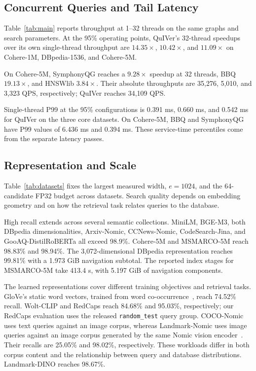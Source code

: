 \subsection{Concurrent Queries and Tail Latency}
\label{sec:threads}
Table~\ref{tab:main} reports throughput at 1--32 threads on the same graphs and search parameters. At the 95\% operating points, QuIVer's 32-thread speedups over its own single-thread throughput are $14.35\times$, $10.42\times$, and $11.09\times$ on Cohere-1M, DBpedia-1536, and Cohere-5M.

On Cohere-5M, SymphonyQG reaches a $9.28\times$ speedup at 32 threads, BBQ $19.13\times$, and HNSWlib $3.84\times$. Their absolute throughputs are 35,276, 5,010, and 3,323 QPS, respectively; QuIVer reaches 34,109 QPS.

Single-thread P99 at the 95\% configurations is 0.391 ms, 0.660 ms, and 0.542 ms for QuIVer on the three core datasets. On Cohere-5M, BBQ and SymphonyQG have P99 values of 6.436 ms and 0.394 ms. These service-time percentiles come from the separate latency passes.

\subsection{Representation and Scale}
\label{sec:scope}
Table~\ref{tab:datasets} fixes the largest measured width, $e=1024$, and the 64-candidate FP32 budget across datasets. Search quality depends on embedding geometry and on how the retrieval task relates queries to the database.

High recall extends across several semantic collections. MiniLM, BGE-M3, both DBpedia dimensionalities, Arxiv-Nomic, CCNews-Nomic, CodeSearch-Jina, and GooAQ-DistilRoBERTa all exceed 98.9\%. Cohere-5M and MSMARCO-5M reach 98.83\% and 98.94\%. The 3,072-dimensional DBpedia representation reaches 99.81\% with a 1.973 GiB navigation subtotal. The reported index stages for MSMARCO-5M take 413.4 s, with 5.197 GiB of navigation components.

The learned representations cover different training objectives and retrieval tasks. GloVe's static word vectors, trained from word co-occurrence~\cite{pennington2014glove}, reach 74.52\% recall. Wolt-CLIP and RedCaps reach 84.68\% and 95.03\%, respectively; our RedCaps evaluation uses the released \texttt{random\_test} query group. COCO-Nomic uses text queries against an image corpus, whereas Landmark-Nomic uses image queries against an image corpus generated by the same Nomic vision encoder~\cite{jaasaari2025vibe}. Their recalls are 25.05\% and 98.02\%, respectively. These workloads differ in both corpus content and the relationship between query and database distributions. Landmark-DINO reaches 98.67\%.

